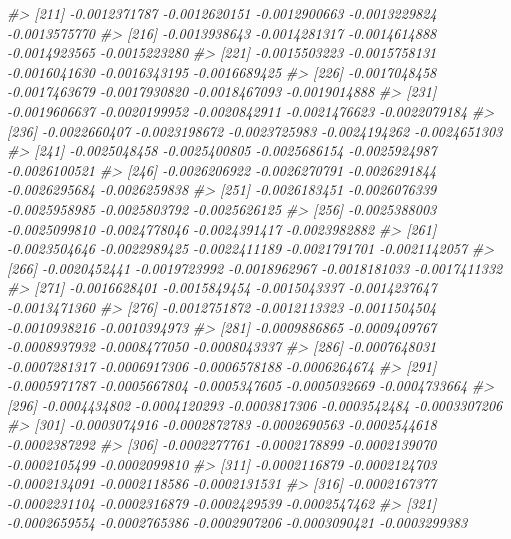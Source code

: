 \documentclass[
]{article}
\newenvironment{Shaded}{\begin{snugshade}}{\end{snugshade}}
\newcommand{\CommentTok}[1]{\textcolor[rgb]{0.56,0.35,0.01}{\textit{#1}}}
\begin{document}
\begin{Shaded}
\begin{Highlighting}[]
\CommentTok{\#\textgreater{} [211] {-}0.0012371787 {-}0.0012620151 {-}0.0012900663 {-}0.0013229824 {-}0.0013575770}
\CommentTok{\#\textgreater{} [216] {-}0.0013938643 {-}0.0014281317 {-}0.0014614888 {-}0.0014923565 {-}0.0015223280}
\CommentTok{\#\textgreater{} [221] {-}0.0015503223 {-}0.0015758131 {-}0.0016041630 {-}0.0016343195 {-}0.0016689425}
\CommentTok{\#\textgreater{} [226] {-}0.0017048458 {-}0.0017463679 {-}0.0017930820 {-}0.0018467093 {-}0.0019014888}
\CommentTok{\#\textgreater{} [231] {-}0.0019606637 {-}0.0020199952 {-}0.0020842911 {-}0.0021476623 {-}0.0022079184}
\CommentTok{\#\textgreater{} [236] {-}0.0022660407 {-}0.0023198672 {-}0.0023725983 {-}0.0024194262 {-}0.0024651303}
\CommentTok{\#\textgreater{} [241] {-}0.0025048458 {-}0.0025400805 {-}0.0025686154 {-}0.0025924987 {-}0.0026100521}
\CommentTok{\#\textgreater{} [246] {-}0.0026206922 {-}0.0026270791 {-}0.0026291844 {-}0.0026295684 {-}0.0026259838}
\CommentTok{\#\textgreater{} [251] {-}0.0026183451 {-}0.0026076339 {-}0.0025958985 {-}0.0025803792 {-}0.0025626125}
\CommentTok{\#\textgreater{} [256] {-}0.0025388003 {-}0.0025099810 {-}0.0024778046 {-}0.0024391417 {-}0.0023982882}
\CommentTok{\#\textgreater{} [261] {-}0.0023504646 {-}0.0022989425 {-}0.0022411189 {-}0.0021791701 {-}0.0021142057}
\CommentTok{\#\textgreater{} [266] {-}0.0020452441 {-}0.0019723992 {-}0.0018962967 {-}0.0018181033 {-}0.0017411332}
\CommentTok{\#\textgreater{} [271] {-}0.0016628401 {-}0.0015849454 {-}0.0015043337 {-}0.0014237647 {-}0.0013471360}
\CommentTok{\#\textgreater{} [276] {-}0.0012751872 {-}0.0012113323 {-}0.0011504504 {-}0.0010938216 {-}0.0010394973}
\CommentTok{\#\textgreater{} [281] {-}0.0009886865 {-}0.0009409767 {-}0.0008937932 {-}0.0008477050 {-}0.0008043337}
\CommentTok{\#\textgreater{} [286] {-}0.0007648031 {-}0.0007281317 {-}0.0006917306 {-}0.0006578188 {-}0.0006264674}
\CommentTok{\#\textgreater{} [291] {-}0.0005971787 {-}0.0005667804 {-}0.0005347605 {-}0.0005032669 {-}0.0004733664}
\CommentTok{\#\textgreater{} [296] {-}0.0004434802 {-}0.0004120293 {-}0.0003817306 {-}0.0003542484 {-}0.0003307206}
\CommentTok{\#\textgreater{} [301] {-}0.0003074916 {-}0.0002872783 {-}0.0002690563 {-}0.0002544618 {-}0.0002387292}
\CommentTok{\#\textgreater{} [306] {-}0.0002277761 {-}0.0002178899 {-}0.0002139070 {-}0.0002105499 {-}0.0002099810}
\CommentTok{\#\textgreater{} [311] {-}0.0002116879 {-}0.0002124703 {-}0.0002134091 {-}0.0002118586 {-}0.0002131531}
\CommentTok{\#\textgreater{} [316] {-}0.0002167377 {-}0.0002231104 {-}0.0002316879 {-}0.0002429539 {-}0.0002547462}
\CommentTok{\#\textgreater{} [321] {-}0.0002659554 {-}0.0002765386 {-}0.0002907206 {-}0.0003090421 {-}0.0003299383}

\end{Highlighting}
\end{Shaded}
\end{document}
